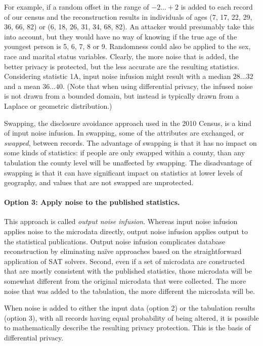 \documentclass[runningheads]{llncs}
\begin{document}
For example, if a random offset in the range of $-2 \ldots +2$ is
added to each record of our census and the reconstruction results in individuals of
ages (7, 17, 22, 29, 36, 66, 82) or (6, 18, 26, 31, 34, 68,
82). An attacker would presumably take this into account, but they
would have no way of knowing if the true age of the youngest person is
5, 6, 7, 8 or 9. Randomness could also be applied to the sex, race
and marital status variables. Clearly, the more noise that is added,
the better privacy is protected, but the less accurate are the
resulting statistics. Considering statistic 1A, input noise infusion
might result with a median $28\ldots32$ and a mean $36\ldots40$.
(Note that when using differential privacy, the infused noise is not
drawn from a bounded domain, but instead is typically drawn from a
Laplace or geometric distribution.)

Swapping, the disclosure avoidance approach used in the 2010 Census,
is a kind of input noise infusion. In swapping, some of the attributes
are exchanged, or \emph{swapped}, between records. The advantage of
swapping is that it has no impact on some kinds of statistics: if
people are only swapped within a county, than any tabulation the
county level will be unaffected by swapping. The disadvantage of
swapping is that it can have significant impact on statistics at lower
levels of geography, and values that are not swapped are unprotected.

\paragraph{Option 3: Apply noise to the published statistics.} This
approach is called \emph{output noise infusion}. Whereas input noise
infusion applies noise to the microdata directly, output noise
infusion applies output to the statistical publications.  Output noise
infusion complicates database reconstruction by eliminating na\"ive
approaches based on the straightforward application of SAT
solvers. Second, even if a set of microdata are constructed that are
mostly consistent with the published statistics, those microdata will
be somewhat different from the original microdata that were
collected. The more noise that was added to the tabulation, the more
different the microdata will be.

When noise is added to either the input data (option 2) or
the tabulation results (option 3), with all records having equal
probability of being altered, it is possible to mathematically
describe the resulting privacy protection. This is the basis of
differential privacy.
\end{document}
